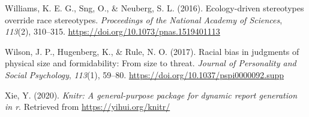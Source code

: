 \documentclass[
  english,
  man, noextraspace,floatsintext]{apa6}
\newlength{\cslhangindent}
\newenvironment{cslreferences}%
  {\setlength{\parindent}{0pt}%
  \everypar{\setlength{\hangindent}{\cslhangindent}}\ignorespaces}%
  {\par}
\begin{document}
\begin{cslreferences}
\leavevmode\hypertarget{ref-Williams2016}{}%
Williams, K. E. G., Sng, O., \& Neuberg, S. L. (2016). Ecology-driven stereotypes override race stereotypes. \emph{Proceedings of the National Academy of Sciences}, \emph{113}(2), 310--315. \url{https://doi.org/10.1073/pnas.1519401113}

\leavevmode\hypertarget{ref-Wilson2017}{}%
Wilson, J. P., Hugenberg, K., \& Rule, N. O. (2017). Racial bias in judgments of physical size and formidability: From size to threat. \emph{Journal of Personality and Social Psychology}, \emph{113}(1), 59--80. \url{https://doi.org/10.1037/pspi0000092.supp}

\leavevmode\hypertarget{ref-R-knitr}{}%
Xie, Y. (2020). \emph{Knitr: A general-purpose package for dynamic report generation in r}. Retrieved from \url{https://yihui.org/knitr/}
\end{cslreferences}
\end{document}
